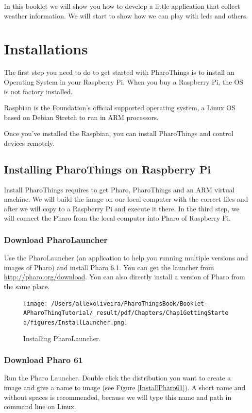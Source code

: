\documentclass[10pt,twoside,english]{_support/latex/sbabook/sbabook}
\begin{document}
\frontmatter
\pagestyle{plain}

\tableofcontents*
\clearpage\listoffigures

\mainmatter


In this booklet we will show you how to develop a little application that collect weather information. 
We will start to show how we can play with leds and others. 
\chapter{Installations }
The first step you need to do to get started with PharoThings is to install an Operating System in your Raspberry Pi. When you buy a Raspberry Pi, the OS is not factory installed.

Raspbian is the Foundation’s official supported operating system, a Linux OS based on Debian Stretch to run in ARM processors.

Once you've installed the Raspbian, you can install PharoThings and control devices remotely. 
\section{Installing PharoThings on Raspberry Pi}
Install PharoThings requires to get Pharo, PharoThings and an ARM virtual machine. We will build the image on our local computer with the correct files and after we will copy to a Raspberry Pi and execute it there. In the third step, we will connect the Pharo from the local computer into Pharo of Raspberry Pi.
\subsection{Download PharoLauncher}
Use the PharoLauncher (an application to help you running multiple versions and images of Pharo) and install Pharo 6.1. You can get the launcher from \url{http://pharo.org/download}.
You can also directly install a version of Pharo from the same place.


\begin{figure}

\begin{center}
\texttt{[image: /Users/allexoliveira/PharoThingsBook/Booklet-APharoThingTutorial/\_result/pdf/Chapters/Chap1GettingStarted/figures/InstallLauncher.png]}\caption{Installing PharoLauncher.\label{installLauncher}}\end{center}
\end{figure}

\subsection{Download Pharo 61}
Run the Pharo Launcher. Double click the distribution you want to create a image and give a name to image (see Figure \ref{InstallPharo61}). A short name and without spaces is recommended, because we will type this name and path in command line on Linux. 
\end{document}
